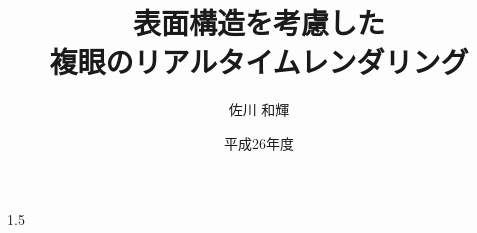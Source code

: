 \documentclass[12pt,a4paper]{jsbook}
\title{表面構造を考慮した\\複眼のリアルタイムレンダリング}
\date{平成26年度}
\author{佐川 和輝}
\begin{document}
\maketitle
\begin{spacing}{1.5}
%

\thispagestyle{headings}
\tableofcontents

\thispagestyle{headings}
\listoffigures

\thispagestyle{headings}
\listoftables

\mainmatter






%

\clearpage
\end{spacing}{1.5}
\backtitle
\end{document}
